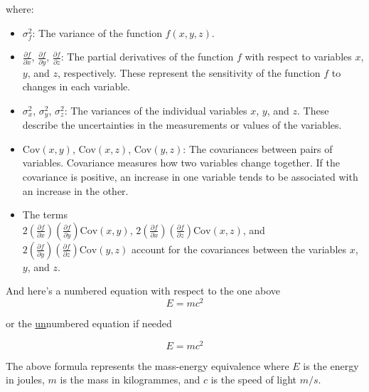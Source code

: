 \documentclass[a4paper, twocolumn]{article}
\begin{document}
where:
\begin{itemize}
    \item \( \sigma_f^2 \): The variance of the function \( f(x, y, z) \).
    \item \( \frac{\partial f}{\partial x} \), \( \frac{\partial f}{\partial y} \), \( \frac{\partial f}{\partial z} \): The partial derivatives of the function \( f \) with respect to variables \( x \), \( y \), and \( z \), respectively. These represent the sensitivity of the function \( f \) to changes in each variable.
    \item \( \sigma_x^2 \), \( \sigma_y^2 \), \( \sigma_z^2 \): The variances of the individual variables \( x \), \( y \), and \( z \). These describe the uncertainties in the measurements or values of the variables.
    \item \( \text{Cov}(x, y) \), \( \text{Cov}(x, z) \), \( \text{Cov}(y, z) \): The covariances between pairs of variables. Covariance measures how two variables change together. If the covariance is positive, an increase in one variable tends to be associated with an increase in the other.
    \item The terms\\ \( 2 \left( \frac{\partial f}{\partial x} \right) \left( \frac{\partial f}{\partial y} \right) \text{Cov}(x, y) \), \( 2 \left( \frac{\partial f}{\partial x} \right) \left( \frac{\partial f}{\partial z} \right) \text{Cov}(x, z) \), and \( 2 \left( \frac{\partial f}{\partial y} \right) \left( \frac{\partial f}{\partial z} \right) \text{Cov}(y, z) \) account for the covariances between the variables \( x \), \( y \), and \( z \).
\end{itemize}

And here's a numbered equation with respect to the one above
\begin{equation}
    E = m c^2
\end{equation}

or the \underline{un}numbered equation if needed

$$
    E = m c^2
$$

The above formula represents the mass-energy equivalence where \( E \) is the energy in joules, \( m \) is the mass in kilogrammes, and \( c \) is the speed of light $m/s$.
\end{document}
